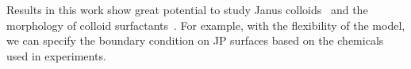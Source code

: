 %
Results in this work show great potential to study Janus
colloids~\cite{Bradley2017,Mallory2017} and the morphology of colloid
surfactants~\cite{Bradley2016}.  For example, with the flexibility of
the model, we can specify the boundary condition on JP surfaces based on
the chemicals used in experiments.




%
%

